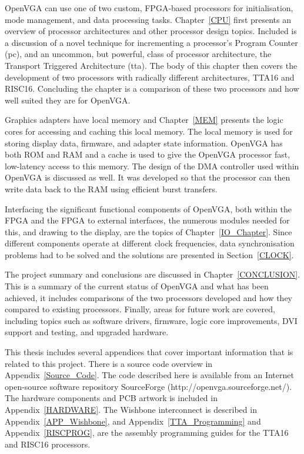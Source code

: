 OpenVGA can use one of two custom, FPGA-based processors for initialisation, mode
management, and data processing tasks. Chapter~\ref{CPU} first presents an
overview of processor architectures and other processor design topics. Included
is a discussion of a novel technique for incrementing a processor's Program
Counter (\gls{pc}), and an uncommon, but powerful, class of processor
architecture, the Transport Triggered Architecture (\gls{tta}). The body of this
chapter then covers the development of two processors
with radically different architectures, TTA16 and RISC16. Concluding the chapter
is a comparison of these two processors and how well suited they are for OpenVGA.

Graphics adapters have local memory and Chapter~\ref{MEM} presents the logic
cores for accessing and caching this local memory. The local memory is used for
storing display data, firmware, and adapter state information. OpenVGA has both
ROM and RAM and a cache is used to give the OpenVGA processor fast, low-latency
access to this memory. The design of the DMA controller used within OpenVGA is
discussed as well. It was developed so that the processor can then write data
back to the RAM using efficient burst transfers.

Interfacing the significant functional components of OpenVGA, both within the
FPGA and the FPGA to external interfaces, the numerous modules needed for this,
and drawing to the display, are the topics of Chapter~\ref{IO_Chapter}. Since
different components operate at different clock frequencies, data synchronisation
problems had to be solved and the solutions are presented in Section~\ref{CLOCK}.

The project summary and conclusions are discussed in Chapter~\ref{CONCLUSION}.
This is a summary of the current status of OpenVGA and what has been achieved, it
includes comparisons of the two processors developed and how they compared to
existing processors. Finally, areas for future work are covered, including
topics such as software drivers, firmware, logic core improvements, DVI support
and testing, and upgraded hardware.

This thesis includes several appendices that cover important information that is
related to this project. There is a source code overview in
Appendix~\ref{Source_Code}. The code described here is available from an Internet
open-source software repository SourceForge (http://openvga.sourceforge.net/).
The hardware components and PCB artwork is included in Appendix~\ref{HARDWARE}.
The Wishbone interconnect is described in Appendix~\ref{APP_Wishbone}, and
Appendix~\ref{TTA_Programming} and Appendix~\ref{RISCPROG}, are the assembly
programming guides for the TTA16 and RISC16 processors.
